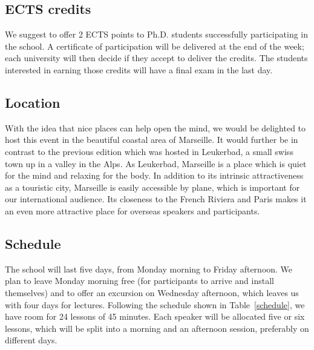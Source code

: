 \documentclass[a4paper]{scrartcl}
\begin{document}
\subsection{ECTS credits}

We suggest to offer 2 ECTS points to Ph.D. students successfully participating
in the school. A certificate of participation will be delivered at the end of
the week; each university will then decide if they accept to deliver the
credits. The students interested in earning those credits will have a final exam
in the last day.


\subsection{Location}

With the idea that nice places can help open the mind, we would be delighted to
host this event in the beautiful coastal area of Marseille. It would further be
in contrast to the previous edition which was hosted in Leukerbad, a small swiss
town up in a valley in the Alps. As Leukerbad, Marseille is a place which is
quiet for the mind and relaxing for the body. 
In addition to its intrinsic attractiveness as a touristic city, Marseille is
easily accessible by plane, which is important for our international audience.
Its closeness to the French Riviera and Paris makes it an even more attractive
place for overseas speakers and participants.

\subsection{Schedule}

The school will last five days, from Monday morning to Friday afternoon. We plan
to leave Monday morning free (for participants to arrive and install themselves)
and to offer an excursion on Wednesday afternoon, which leaves us with four days
for lectures. Following the schedule shown in Table~\ref{schedule}, we have room
for 24 lessons of 45 minutes. Each speaker will be allocated five or six
lessons, which will be split into a morning and an afternoon session, preferably
on different days.
\end{document}
